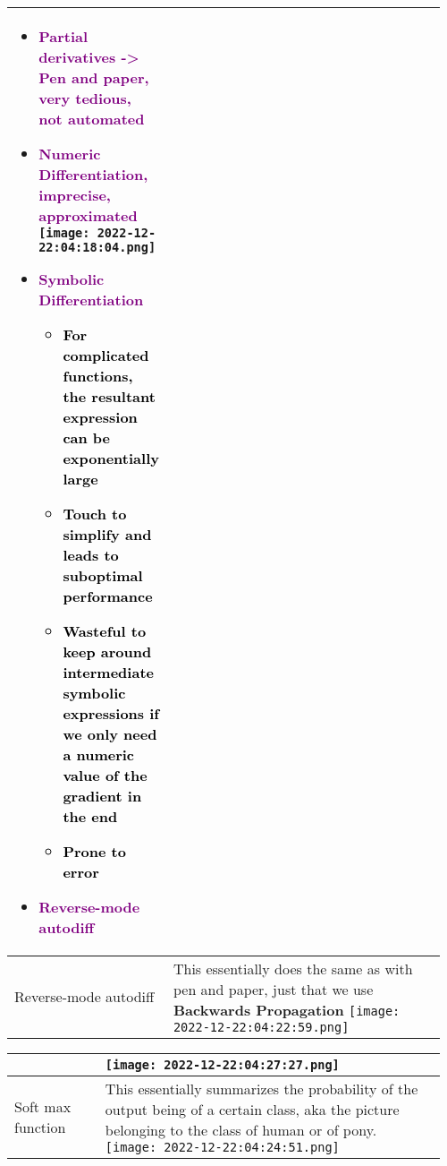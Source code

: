 \documentclass[main.tex,fontsize=8pt,paper=a4,paper=portrait,DIV=calc,]{scrartcl}
\begin{document}
\begin{table}[ht!]
\begin{tabular}{|m{0.2\linewidth}|m{0.755\linewidth}|}
\begin{itemize}
\item \textcolor{purple}{Partial derivatives -> Pen and paper, very tedious, not automated}
\item \textcolor{purple}{Numeric Differentiation, imprecise, approximated}\newline
\texttt{[image: 2022-12-22:04:18:04.png]}
\item \textcolor{purple}{Symbolic Differentiation}\newline
  \begin{itemize}
  \item \textcolor{black}{For complicated functions, the resultant expression can be exponentially large}
  \item \textcolor{black}{Touch to simplify and leads to suboptimal performance}
  \item \textcolor{black}{Wasteful to keep around intermediate symbolic expressions if we only need a numeric value of the gradient in the end}
  \item \textcolor{black}{Prone to error}
  \end{itemize} 
\item \textcolor{purple}{Reverse-mode autodiff}
\vspace{-3mm}
\end{itemize} 
\\
\hline
Reverse-mode autodiff  & 
This essentially does the same as with pen and paper, just that we use \textbf{Backwards Propagation}\newline
\texttt{[image: 2022-12-22:04:22:59.png]}
\\
\hline
\end{tabular}
\end{table}
\pagebreak
\begin{table}[ht!]
\begin{tabular}{|m{0.2\linewidth}|m{0.755\linewidth}|}
\hline
&
\vspace{2mm}
\texttt{[image: 2022-12-22:04:27:27.png]}\\
\hline
Soft max function & 
This essentially summarizes the probability of the output being of a certain class, aka the picture belonging to the class of human or of pony.\newline
\texttt{[image: 2022-12-22:04:24:51.png]}
\\
\hline
\end{tabular}
\end{table}
\end{document}
